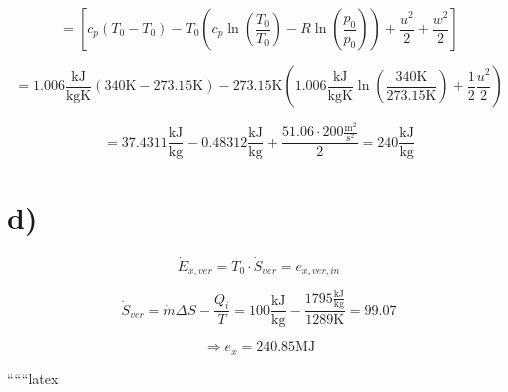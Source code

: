 \[
= \left[ c_p \left( T_0 - T_0 \right) - T_0 \left( c_p \ln \left( \frac{T_0}{T_0} \right) - R \ln \left( \frac{p_0}{p_0} \right) \right) + \frac{u^2}{2} + \frac{w^2}{2} \right]
\]

\[
= 1.006 \frac{\text{kJ}}{\text{kgK}} \left( 340 \text{K} - 273.15 \text{K} \right) - 273.15 \text{K} \left( 1.006 \frac{\text{kJ}}{\text{kgK}} \ln \left( \frac{340 \text{K}}{273.15 \text{K}} \right) + \frac{1}{2} \frac{u^2}{2} \right)
\]

\[
= 37.4311 \frac{\text{kJ}}{\text{kg}} - 0.48312 \frac{\text{kJ}}{\text{kg}} + \frac{51.06 \cdot 200 \frac{\text{m}^2}{\text{s}^2}}{2} = 240 \frac{\text{kJ}}{\text{kg}}
\]

\section*{d)}

\[
\dot{E}_{x,ver} = T_0 \cdot \dot{S}_{ver} = e_{x,ver,in}
\]

\[
\dot{S}_{ver} = \dot{m} \Delta S - \frac{Q_i}{T} = 100 \frac{\text{kJ}}{\text{kg}} - \frac{1795 \frac{\text{kJ}}{\text{kg}}}{1289 \text{K}} = 99.07
\]

\[
\Rightarrow e_x = 240.85 \text{MJ}
\]

``````latex


